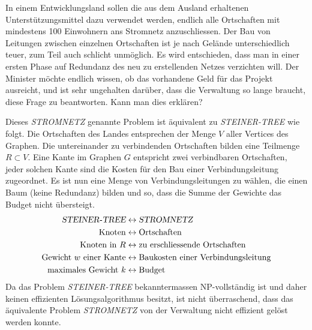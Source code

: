 In einem Entwicklungsland sollen die aus dem Ausland erhaltenen
Unterstützungsmittel dazu verwendet werden, endlich alle Ortschaften
mit mindestens 100 Einwohnern ans Stromnetz anzuschliessen.
Der Bau von Leitungen zwischen einzelnen Ortschaften ist je nach
Gelände unterschiedlich teuer, zum Teil auch schlicht unmöglich.
Es wird entschieden, dass man in einer ersten Phase auf Redundanz des
neu zu erstellenden Netzes verzichten will.
Der Minister möchte endlich wissen,
ob das vorhandene Geld für das Projekt ausreicht, und ist sehr ungehalten
darüber, dass die Verwaltung so lange braucht, diese Frage zu beantworten.
Kann man dies erklären?


\begin{loesung}
Dieses \textsl{STROMNETZ} genannte Problem ist äquivalent zu
\textsl{STEINER-TREE} wie folgt.
Die Ortschaften des Landes entsprechen der Menge $V$ aller Vertices des
Graphen. Die untereinander zu verbindenden Ortschaften bilden eine Teilmenge
$R\subset V$.
Eine Kante im Graphen $G$ entspricht zwei verbindbaren Ortschaften,
jeder solchen Kante sind die Kosten für den Bau einer Verbindungsleitung
zugeordnet.
Es ist nun eine Menge von Verbindungsleitungen zu wählen, die einen Baum
(keine Redundanz) bilden und so, dass die Summe der Gewichte das 
Budget nicht übersteigt.
\begin{align*}
\textsl{STEINER-TREE}&\leftrightarrow\textsl{STROMNETZ}\\
\text{Knoten}&\leftrightarrow\text{Ortschaften}\\
\text{Knoten in $R$}&\leftrightarrow\text{zu erschliessende Ortschaften}\\
\text{Gewicht $w$ einer Kante}&\leftrightarrow \text{Baukosten einer Verbindungsleitung}\\
\text{maximales Gewicht $k$}&\leftrightarrow\text{Budget}
\end{align*}
Da das Problem \textsl{STEINER-TREE} bekanntermassen NP-vollständig ist
und daher keinen effizienten Lösungsalgorithmus besitzt, ist nicht
überraschend, dass das äquivalente Problem \textsl{STROMNETZ} von
der Verwaltung nicht effizient gelöst werden konnte.
\end{loesung}


